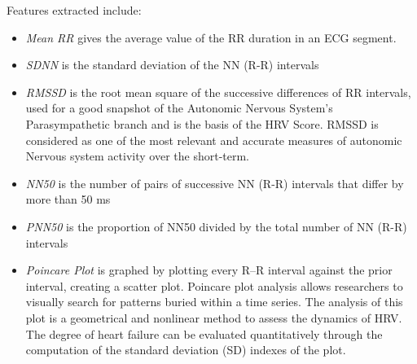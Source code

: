 \documentclass[11pt]{article}
\theoremstyle{definition}
\begin{document}
  Features extracted include:
  \begin{itemize}[topsep=1pt]
    \item[] \textit{Mean RR} gives the average value of the RR duration in an ECG segment.
    \item[] \textit{SDNN} is the standard deviation of the NN (R-R) intervals
    \item[] \textit{RMSSD} is the root mean square of the successive differences of RR intervals, used for a good snapshot of the Autonomic Nervous System’s Parasympathetic branch and is the basis of the HRV Score.  RMSSD is considered as one of the most relevant and accurate measures of autonomic Nervous system activity over the short-term.
    \item[] \textit{NN50} is the number of pairs of successive NN (R-R) intervals that differ by more than 50 ms
    \item[] \textit{PNN50} is the proportion of NN50 divided by the total number of NN (R-R) intervals
    \item[] \textit{Poincare Plot} is graphed by plotting every R–R interval against the prior interval, creating a scatter plot.
    Poincare plot analysis allows researchers to visually search for patterns buried within a time series.
    The analysis of this plot is a geometrical and nonlinear method to assess the dynamics of HRV.
    The degree of heart failure can be evaluated quantitatively through the computation of the standard deviation (SD) indexes of the plot\cite{hsu2012poincare}.
  \end{itemize}
\end{document}
